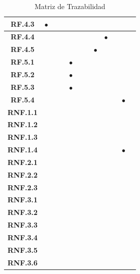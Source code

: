 \begin{table}[H]
\begin{tabular}{|c|@{}c|@{}c|@{}c|@{}c|@{}c|@{}c|@{}c|@{}c|@{}c|@{}c|@{}c|}
        \hline
        \textbf{RF.4.3} & $\bullet$ &  & &  &  &  &  &  &  & & \\
        \hline
        \textbf{RF.4.4} &  &  &  & &  &  &  & $\bullet$ &  & & \\
        \hline
        \textbf{RF.4.5} &  &  &  & & &  & $\bullet$ &  &  & & \\
        \hline
        \textbf{RF.5.1} &  &  &  & $\bullet$ & &  &  &  &  & & \\
        \hline
        \textbf{RF.5.2} &  &  &  & $\bullet$ & &  &  &  & & & \\
        \hline
        \textbf{RF.5.3} &  &  &  & $\bullet$ &  &  &  &  &  & & \\
        \hline
        \textbf{RF.5.4} &  &  &  &&  &  &  &  &  & $\bullet$ & \\
    \hline
        \textbf{RNF.1.1} &  &  & & &  &  &  &  &  & & \\
        \hline
        \textbf{RNF.1.2} &  &  & & &  &  &  &  &  & & \\
        \hline
        \textbf{RNF.1.3} &  &  & & &  &  &  &  &  & & \\
        \hline
        \textbf{RNF.1.4} &  &  & & &  &  &  &  &  & $\bullet$ & \\
        \hline
        \textbf{RNF.2.1} &  &  & & &  &  &  &  &  & & \\
        \hline
        \textbf{RNF.2.2} &  &  & & &  &  &  &  &  & & \\
        \hline
        \textbf{RNF.2.3} &  &  & & &  &  &  &  &  & & \\
        \hline
        \textbf{RNF.3.1} &  &  & & &  &  &  &  &  & & \\
        \hline
        \textbf{RNF.3.2} &  &  &&  &  &  &  &  &  & & \\
        \hline
        \textbf{RNF.3.3} &  &  & & &  &  &  &  &  & & \\
        \hline
        \textbf{RNF.3.4} &  &  & & &  &  &  &  &  & & \\
        \hline
        \textbf{RNF.3.5} &  &  & & &  &  &  &  &  & & \\
        \hline
        \textbf{RNF.3.6} &  &  &  & &  &  &  &  &  & & \\
    \hline
    \end{tabular}
    \caption{Matriz de Trazabilidad}
    \label{tab:matriz-trazabilidad}
\end{table}

